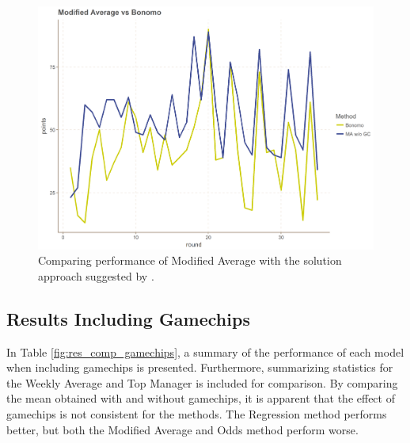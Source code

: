 \begin{figure}[H]
    \centering
    \includegraphics[scale=0.5]{fig/chapter_7/bon_gc_no_gc.png}
    \caption{Comparing performance of Modified Average with the solution approach suggested by \cite{Bonomo}.}
\label{fig:avg_vs_bon}    
\end{figure}

\begin{table}[H]
\centering
{}
\caption{Performance of Modified Average and \cite{Bonomo}}
\label{tab:bonomo_mofidified_average}
\end{table}


\subsection{Results Including Gamechips}

In Table \ref{fig:res_comp_gamechips}, a summary of the performance of each model when including gamechips is presented. Furthermore, summarizing statistics for the Weekly Average and Top Manager is included for comparison. By comparing the mean obtained with and without gamechips, it is apparent that the effect of gamechips is not consistent for the methods. The Regression method performs better, but both the Modified Average and Odds method perform worse.


